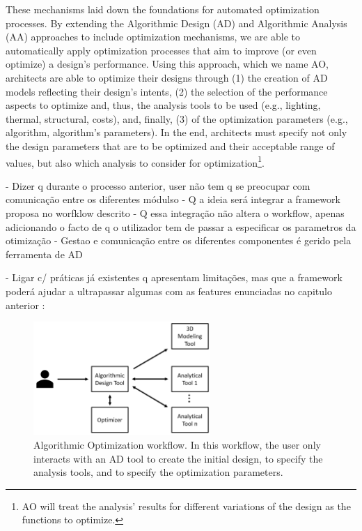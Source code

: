 These mechanisms laid down the foundations for automated optimization processes. By extending the Algorithmic Design (AD) and Algorithmic Analysis (AA) approaches to include optimization mechanisms, we are able to automatically apply optimization processes that aim to improve (or even optimize) a design’s performance. Using this approach, which we name \ac{AO}, architects are able to optimize their designs through (1) the creation of \ac{AD} models reflecting their design's intents, (2) the selection of the performance aspects to optimize and, thus, the analysis tools to be used (e.g., lighting, thermal, structural, costs), and, finally, (3) of the optimization parameters (e.g., algorithm, algorithm's parameters). In the end, architects must specify not only the design parameters that are to be optimized and their acceptable range of values, but also which analysis to consider for optimization\footnote{\ac{AO} will treat the analysis' results for different variations of the design as the functions to optimize.}. 

- Dizer q durante o processo anterior, user não tem q se preocupar com comunicação entre os diferentes módulso
- Q a ideia será integrar a framework proposa no worfklow descrito
- Q essa integração não altera o workflow, apenas adicionando o facto de q o utilizador tem de passar a especificar os parametros da otimização
- Gestao e comunicação entre os diferentes componentes é gerido pela ferramenta de \ac{AD}

- Ligar c/ práticas já existentes q apresentam limitações, mas que a framework poderá ajudar a ultrapassar algumas com as features enunciadas no capitulo anterior : 





\begin{figure}[htbp]
	\centering
	\includegraphics[width=0.6\textwidth]{./Images/Solution/algorithmic_optimization.png}
	\caption{Algorithmic Optimization workflow. In this workflow, the user only interacts with an \ac{AD} tool to create the initial design, to specify the analysis tools, and to specify the optimization parameters.}
	\label{fig:algorithmicoptimization}
\end{figure}

